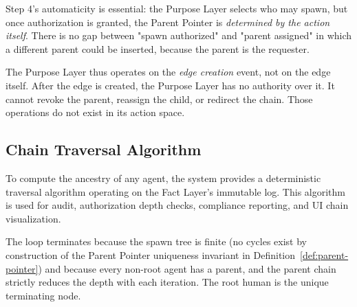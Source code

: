 Step 4's automaticity is essential: the Purpose Layer selects who may spawn, but once authorization is granted, the Parent Pointer is \textit{determined by the action itself}. There is no gap between "spawn authorized" and "parent assigned" in which a different parent could be inserted, because the parent is the requester.

The Purpose Layer thus operates on the \textit{edge creation} event, not on the edge itself. After the edge is created, the Purpose Layer has no authority over it. It cannot revoke the parent, reassign the child, or redirect the chain. Those operations do not exist in its action space.

\subsection{Chain Traversal Algorithm}

To compute the ancestry of any agent, the system provides a deterministic traversal algorithm operating on the Fact Layer's immutable log. This algorithm is used for audit, authorization depth checks, compliance reporting, and UI chain visualization.

\begin{algorithm}
\label{alg:chain-traversal}
\begin{algorithmorithmic}
\Require{Agent identifier $a$, Fact Layer query interface $\mathcal{F}$
\Ensure{Ordered list $C$ of parent-agent identifiers from immediate parent to root}

\Procedure{ChainTraverse}{$a$}
    \If{$a = root$}
        \Return{$\varnothing$}
    \EndIf
    \State $C \gets \text{empty list}$
    \State $current \gets a$
    \While{$current \neq root$}
        \State $parent \gets \mathcal{F}.\text{query\_parent}(current)$
        \Comment{Returns the unique $p$ such that $ParentPointer(p, current)$}
        \State $\text{append}(C, parent)$
        \State $current \gets parent$
    \EndWhile
    \State \Return{$C$}
\EndProcedure
\end{algorithmorithmic}
\end{algorithm}

The loop terminates because the spawn tree is finite (no cycles exist by construction of the Parent Pointer uniqueness invariant in Definition~\ref{def:parent-pointer}) and because every non-root agent has a parent, and the parent chain strictly reduces the depth with each iteration. The root human is the unique terminating node.

